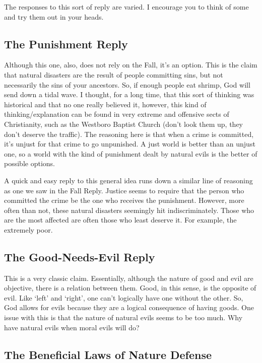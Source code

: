 The responses to this sort of reply are varied. I encourage you to think of some and try them out in your heads.
\subsection{The Punishment Reply}

Although this one, also, does not rely on the Fall, it's an option. This is the claim that natural disasters are the result of people committing sins, but not necessarily the sins of your ancestors. So, if enough people eat shrimp, God will send down a tidal wave. I thought, for a long time, that this sort of thinking was historical and that no one really believed it, however, this kind of thinking/explanation can be found in very extreme and offensive sects of Christianity, such as the Westboro Baptist Church (don't look them up, they don't deserve the traffic). The reasoning here is that when a crime is committed, it's unjust for that crime to go unpunished. A just world is better than an unjust one, so a world with the kind of punishment dealt by natural evils is the better of possible options.

A quick and easy reply to this general idea runs down a similar line of reasoning as one we saw in the Fall Reply. Justice seems to require that the person who committed the crime be the one who receives the punishment. However, more often than not, these natural disasters seemingly hit indiscriminately. Those who are the most affected are often those who least deserve it. For example, the extremely poor.
\subsection{The Good-Needs-Evil Reply}

This is a very classic claim. Essentially, although the nature of good and evil are objective, there is a relation between them. Good, in this sense, is the opposite of evil. Like ‘left’ and ‘right’, one can’t logically have one without the other. So, God allows for evils because they are a logical consequence of having goods. One issue with this is that the nature of natural evils seems to be too much. Why have natural evils when moral evils will do?
\subsection{The Beneficial Laws of Nature Defense}

